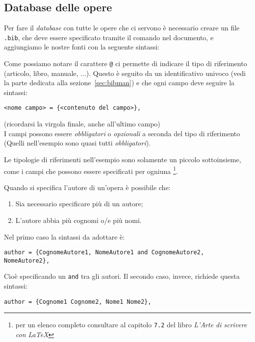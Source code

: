 \subsection{Database delle opere}
Per fare il \textit{database} con tutte le opere che ci servono è necessario
creare un file \texttt{.bib}, che deve essere specificato tramite il comando
\verb!! nel documento, e aggiungiamo le nostre
fonti con la seguente sintassi:

Come possiamo notare il carattere \verb!@! ci permette di indicare il tipo di
riferimento (articolo, libro, manuale, ...). Questo è seguito da un
identificativo univoco (vedi la parte dedicata alla sezione~\ref{sec:bibman})
e che ogni campo deve seguire la sintassi:
\begin{lstlisting}
<nome campo> = {<contenuto del campo>},
\end{lstlisting}
(ricordarsi la virgola finale, anche all'ultimo campo)\\
I campi possono essere \emph{obbligatori} o \emph{opzionali} a seconda del
tipo di riferimento (Quelli nell'esempio sono quasi tutti \emph{obbligatori}).
\par Le tipologie di riferimenti nell'esempio sono solamente un piccolo
sottoinsieme, come i campi che possono essere specificati per ogniuna
\footnote{per un elenco completo consultare al capitolo \texttt{7.2} del libro
\textit{L'Arte di scrivere con \LaTeX{}}}.
\par Quando si specifica l'autore di un'opera è possibile che:
\begin{enumerate}
    \item Sia necessario specificare più di un autore;
    \item L'autore abbia più cognomi o/e più nomi.
\end{enumerate}
Nel primo caso la sintassi da adottare è:
\begin{lstlisting}
author = {CognomeAutore1, NomeAutore1 and CognomeAutore2, NomeAutore2},
\end{lstlisting}
Cioè specificando un \texttt{and} tra gli autori. Il secondo caso, invece,
richiede questa sintassi:
\begin{lstlisting}
author = {Cognome1 Cognome2, Nome1 Nome2},
\end{lstlisting}

